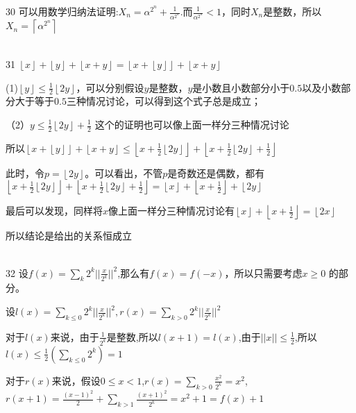 \documentclass[onecolumn]{article}
\begin{document}
30 可以用数学归纳法证明:$X_{n}=\alpha^{2^{n}}+\frac{1}{\alpha^{2^{n}}}$.而$\frac{1}{\alpha^{2^{n}}}<1$，同时$X_{n}$是整数，所以$X_{n}=\left \lceil \alpha^{2^{n}} \right \rceil$ \par
~\\
31 $\left \lfloor x \right \rfloor+\left \lfloor y \right \rfloor+\left \lfloor x+y \right \rfloor=\left \lfloor x+\left \lfloor y \right \rfloor \right \rfloor+\left \lfloor x+y \right \rfloor$ \par
(1)$\left \lfloor y \right \rfloor\leq \frac{1}{2}\left \lfloor 2y \right \rfloor$，可以分别假设$y$是整数，$y$是小数且小数部分小于$0.5$以及小数部分大于等于$0.5$三种情况讨论，可以得到这个式子总是成立；\par
（2）$y\leq  \frac{1}{2}\left \lfloor 2y \right \rfloor+\frac{1}{2}$ 这个的证明也可以像上面一样分三种情况讨论 \par
所以$\left \lfloor x+\left \lfloor y \right \rfloor \right \rfloor+\left \lfloor x+y \right \rfloor\leq \left \lfloor x+\frac{1}{2}\left \lfloor 2y \right \rfloor \right \rfloor+\left \lfloor x+\frac{1}{2}\left \lfloor 2y \right \rfloor+\frac{1}{2} \right \rfloor$ \par
此时，令$p=\left \lfloor 2y \right \rfloor$。可以看出，不管$p$是奇数还是偶数，都有$\left \lfloor x+\frac{1}{2}\left \lfloor 2y \right \rfloor \right \rfloor+\left \lfloor x+\frac{1}{2}\left \lfloor 2y \right \rfloor+\frac{1}{2} \right \rfloor=\left \lfloor x \right \rfloor+\left \lfloor x+\frac{1}{2} \right \rfloor+\left \lfloor 2y \right \rfloor$ \par
最后可以发现，同样将$x$像上面一样分三种情况讨论有$\left \lfloor x \right \rfloor+\left \lfloor x+\frac{1}{2} \right \rfloor=\left \lfloor 2x \right \rfloor$ \par
所以结论是给出的关系恒成立 \par
~\\
32 设$f(x)=\sum _{k}2^{k}||\frac{x}{2^{k}}||^{2}$,那么有$f(x)=f(-x)$，所以只需要考虑$x\geq 0$ 的部分。\par
设$l(x)=\sum _{k\leq 0}2^{k}||\frac{x}{2^{k}}||^{2},r(x)=\sum _{k>0}2^{k}||\frac{x}{2^{k}}||^{2}$ \par
对于$l(x)$来说，由于$\frac{1}{2^{k}}$是整数,所以$l(x+1)=l(x)$,由于$||x||\leq \frac{1}{2}$,所以$l(x)\leq \frac{1}{2}(\sum _{k\leq 0}2^{k})=1$ \par
对于$r(x)$来说，假设$0 \leq x < 1$,$r(x)=\sum _{k>0}\frac{x^{2}}{2^{k}}=x^{2}$,$r(x+1)=\frac{(x-1)^{2}}{2}+\sum _{k>1}\frac{(x+1)^{2}}{2^{k}}=x^{2}+1=f(x)+1$ \par
\end{document}
